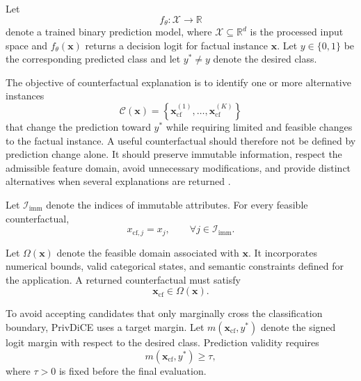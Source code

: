 \documentclass[preprint,12pt]{elsarticle}
\begin{document}
Let
\begin{equation}
f_{\theta}: \mathcal{X} \rightarrow \mathbb{R}
\end{equation}
denote a trained binary prediction model, where $\mathcal{X}\subseteq
\mathbb{R}^{d}$ is the processed input space and $f_{\theta}(\mathbf{x})$
returns a decision logit for factual instance $\mathbf{x}$. Let $y\in\{0,1\}$
be the corresponding predicted class and let $y^{*}\neq y$ denote the desired
class.

The objective of counterfactual explanation is to identify one or more
alternative instances
\begin{equation}
\mathcal{C}(\mathbf{x}) =
\left\{
\mathbf{x}_{\mathrm{cf}}^{(1)},\ldots,
\mathbf{x}_{\mathrm{cf}}^{(K)}
\right\}
\end{equation}
that change the prediction toward $y^{*}$ while requiring limited and feasible
changes to the factual instance. A useful counterfactual should therefore not
be defined by prediction change alone. It should preserve immutable
information, respect the admissible feature domain, avoid unnecessary
modifications, and provide distinct alternatives when several explanations are
returned
\cite{mothilal2020dice,duong2024proce,wijekoon2023discern}.

Let $\mathcal{I}_{\mathrm{imm}}$ denote the indices of immutable attributes.
For every feasible counterfactual,
\begin{equation}
x_{\mathrm{cf},j}=x_j,
\qquad
\forall j\in\mathcal{I}_{\mathrm{imm}}.
\label{eq:immutable_constraint}
\end{equation}

Let $\Omega(\mathbf{x})$ denote the feasible domain associated with
$\mathbf{x}$. It incorporates numerical bounds, valid categorical states, and
semantic constraints defined for the application. A returned counterfactual
must satisfy
\begin{equation}
\mathbf{x}_{\mathrm{cf}}\in\Omega(\mathbf{x}).
\label{eq:feasible_domain}
\end{equation}

To avoid accepting candidates that only marginally cross the classification
boundary, PrivDiCE uses a target margin. Let
$m(\mathbf{x}_{\mathrm{cf}},y^{*})$ denote the signed logit margin with respect
to the desired class. Prediction validity requires
\begin{equation}
m(\mathbf{x}_{\mathrm{cf}},y^{*})\geq \tau,
\label{eq:valid_margin}
\end{equation}
where $\tau>0$ is fixed before the final evaluation.
\end{document}
